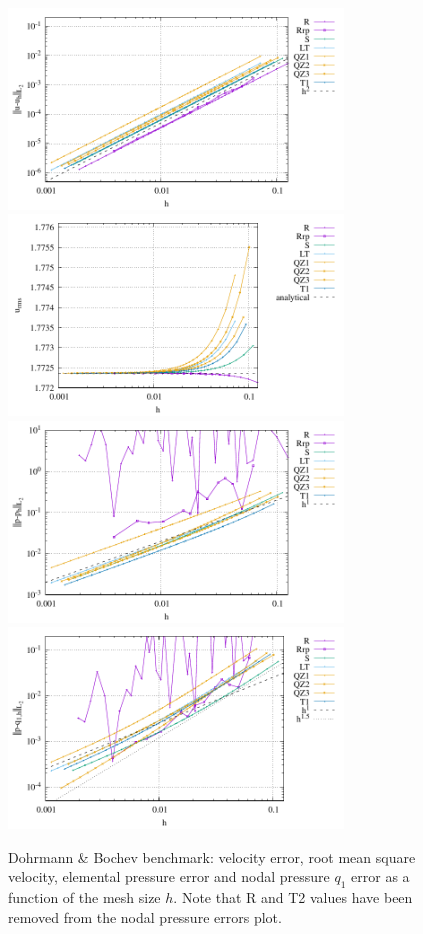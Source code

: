 \documentclass[a4paper,12pt]{article}
\begin{document}
\begin{figure}
\centering
\includegraphics[width=8.9cm]{../results/errors_u_exp9}
\includegraphics[width=8.9cm]{../results/vrms_exp9} \\
\includegraphics[width=8.9cm]{../results/errors_p_exp9}
\includegraphics[width=8.9cm]{../results/errors_q1_exp9}
\caption{Dohrmann \& Bochev benchmark: velocity error, 
root mean square velocity, elemental pressure error and nodal pressure $q_1$ error
as a function of the mesh size $h$.
Note that R and T2 values have been removed from the nodal pressure errors plot.} 
\label{fig:resexp9}
\end{figure}
\end{document}
